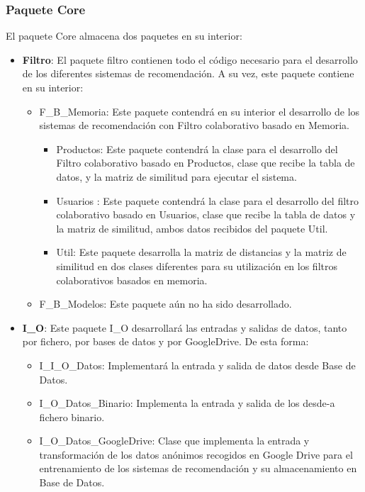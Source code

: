 \subsubsection{Paquete Core}
El paquete Core almacena dos paquetes en su interior: 
\begin{itemize}
\item \textbf{Filtro}: El paquete filtro contienen todo el código necesario para el desarrollo de los diferentes sistemas de recomendación. A su vez, este paquete contiene en su interior: 
\begin{itemize}
\item F\_B\_Memoria: Este paquete contendrá en su interior el desarrollo de los sistemas de recomendación con Filtro colaborativo basado en Memoria. 
\begin{itemize}
\item Productos: Este paquete contendrá la clase para el desarrollo del  Filtro colaborativo basado en Productos, clase que recibe la tabla de datos, y la matriz de similitud para ejecutar el sistema. 
\item Usuarios : Este paquete contendrá la clase para el desarrollo del filtro colaborativo basado en Usuarios, clase que recibe la tabla de datos y la matriz de similitud, ambos datos recibidos del paquete Util. 
\item Util: Este paquete desarrolla la matriz de distancias y la matriz de similitud en dos clases diferentes para  su utilización en los filtros colaborativos basados en memoria.  
\end{itemize}
\item F\_B\_Modelos: Este paquete aún no ha sido desarrollado. 
\end{itemize}
\item \textbf{I\_O}: Este paquete I\_O desarrollará las entradas y salidas de datos, tanto por fichero, por bases de datos y por GoogleDrive. De esta forma:
\begin{itemize}
\item I\_I\_O\_Datos: Implementará la entrada y salida de datos desde Base de Datos. 
\item I\_O\_Datos\_Binario: Implementa la entrada y salida de los desde-a fichero binario. 
\item I\_O\_Datos\_GoogleDrive: Clase que implementa la entrada y transformación de los datos anónimos recogidos en Google Drive para el entrenamiento de los sistemas de recomendación y su almacenamiento en Base de Datos. 
\end{itemize} 
\end{itemize}

